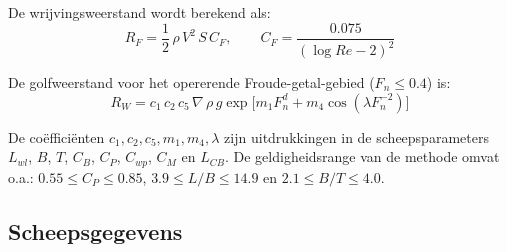 De wrijvingsweerstand wordt berekend als:
\begin{equation}
    R_F = \frac{1}{2}\,\rho\,V^2\,S\,C_F, \qquad
    C_F = \frac{0.075}{(\log Re - 2)^2}
    \label{eq:RF}
\end{equation}
 
De golfweerstand voor het opererende Froude-getal-gebied ($F_n \leq 0.4$) is:
\begin{equation}
    R_W = c_1\,c_2\,c_5\,\nabla\,\rho\,g \exp\!\bigl[m_1 F_n^d + m_4 \cos(\lambda F_n^{-2})\bigr]
    \label{eq:RW}
\end{equation}
 
\noindent De coëfficiënten $c_1, c_2, c_5, m_1, m_4, \lambda$ zijn uitdrukkingen in de
scheepsparameters $L_{wl}$, $B$, $T$, $C_B$, $C_P$, $C_{wp}$, $C_M$ en $L_{CB}$.
De geldigheidsrange van de methode omvat o.a.:
$0.55 \leq C_P \leq 0.85$, $3.9 \leq L/B \leq 14.9$ en $2.1 \leq B/T \leq 4.0$.
 
\subsection{Scheepsgegevens}
\label{subsec:holtrop-scheepsgegevens}
 
